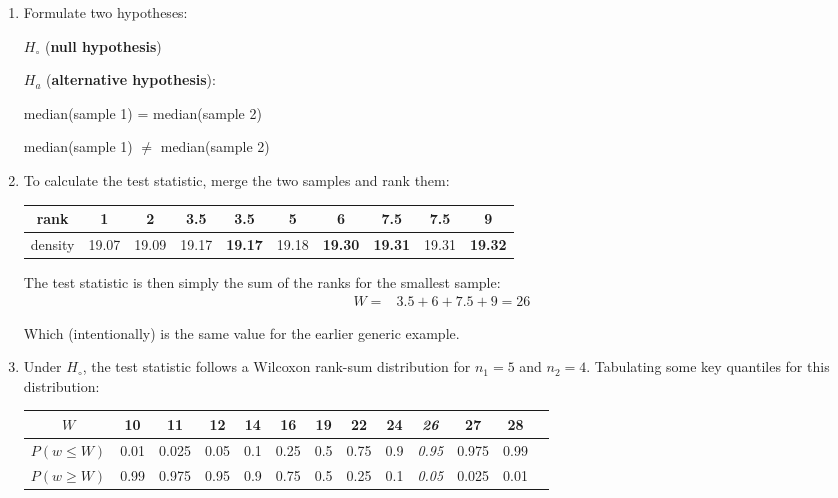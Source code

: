 \begin{enumerate}
\item  Formulate two hypotheses:

  \noindent\begin{minipage}{.4\textwidth}
    $H_\circ$ (\textbf{null hypothesis})
    
    \vspace{1em}
    
    $H_a$ (\textbf{alternative hypothesis}):
  \end{minipage}
  \begin{minipage}{.2\textwidth}
  \end{minipage}
  \begin{minipage}{.4\textwidth}
    median(sample 1) = median(sample 2)
    
    \vspace{1em}
    
    median(sample 1) $\neq$ median(sample 2)
  \end{minipage}
  
\item To calculate the test statistic, merge the two samples and rank
  them:

  \begin{center}
    \begin{tabular}{c|ccccccccc}
      rank & 1 & 2 & 3.5 & \textbf{3.5} & 5 & \textbf{6} & 7.5 &
      \textbf{7.5} & \textbf{9} \\ \hline
      density & 19.07 & 19.09 & 19.17 & \textbf{19.17} & 19.18 &
      \textbf{19.30} & \textbf{19.31} & 19.31 & \textbf{19.32}
    \end{tabular}
  \end{center}

  The test statistic is then simply the sum of the ranks for the
  smallest sample:
  \begin{equation*}
    \begin{split}
      W = & 3.5 + 6 + 7.5 + 9 = 26
    \end{split}
  \end{equation*}

  Which (intentionally) is the same value for the earlier generic
  example.

\item Under $H_\circ$, the test statistic follows a Wilcoxon rank-sum
  distribution for $n_1=5$ and $n_2=4$. Tabulating some key quantiles
  for this distribution:

  \begin{center}
    \begin{tabular}{c|c@{\gap}c@{\gap}c@{\gap}c@{\gap}
        c@{\gap}c@{\gap}c@{\gap}c@{\gap}c@{\gap}c@{\gap}c@{\gap}c}
      $W$ & 10 & 11 & 12 & 14 & 16 & 19 & 22 & 24 & \textit{26} & 27 & 28 \\ \hline
      $P(w\leq{W})$ & 0.01 & 0.025 & 0.05 & 0.1 & 0.25 &
      0.5 & 0.75 & 0.9 & \textit{0.95} & 0.975 & 0.99 \\
      $P(w\geq{W})$ & 0.99 & 0.975 & 0.95 & 0.9 & 0.75 & 0.5 &
      0.25 & 0.1 & \textit{0.05} & 0.025 & 0.01
    \end{tabular}
  \end{center}


\end{enumerate}
